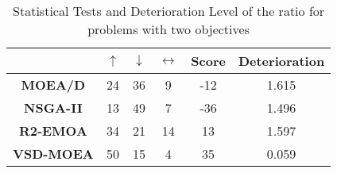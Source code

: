 
\begin{table}[t]
\centering
\caption{Statistical Tests and Deterioration Level of the \HV{} ratio for problems with two objectives}
\label{tab:Tests_HV_2obj}

\begin{scriptsize}
\begin{tabular}{c c|c|c|c|c}
\cline{2-6}
                                        & \textbf{$\uparrow$} & \textbf{$\downarrow$} & \textbf{$\leftrightarrow$} & \textbf{Score}& \textbf{Deterioration} \\ \hline
\multicolumn{1}{c|}{\textbf{MOEA/D}}   & 24                  & 36                     & 9                          & -12                         & 1.615         \\ \hline
\multicolumn{1}{c|}{\textbf{NSGA-II}}  & 13                  & 49                     & 7                          & -36                         & 1.496         \\ \hline
\multicolumn{1}{c|}{\textbf{R2-EMOA}}  & 34                  & 21                     & 14                         & 13                        & 1.597         \\ \hline
\multicolumn{1}{c|}{\textbf{VSD-MOEA}} & 50                  & 15                     & 4                          & 35                         & 0.059         \\ \hline
\end{tabular}%
\end{scriptsize}
\end{table}


%
